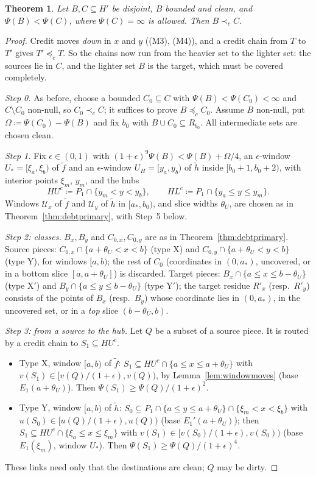 \documentclass[11pt]{article}
\newtheorem{theorem}{Theorem}
\theoremstyle{definition}\newtheorem{definition}[theorem]{Definition}
\theoremstyle{remark}\newtheorem{remark}[theorem]{Remark}
\newcommand{\ftil}{\tilde f}
\newcommand{\htil}{\tilde h}
\begin{document}
\begin{theorem}\label{thm:creditprimary}
Let $B,C\subseteq H'$ be disjoint, $B$ bounded and clean, and
$\Psi(B)<\Psi(C)$, where $\Psi(C)=\infty$ is allowed. Then $B\prec_cC$.
\end{theorem}
\begin{proof}
Credit moves \emph{down} in $x$ and $y$ ((M3), (M4)), and a credit chain from
$T$ to $T'$ gives $T'\preceq_cT$. So the chains now run from the heavier set
to the lighter set: the sources lie in $C$, and the lighter set $B$ is the
target, which must be covered completely.

\emph{Step 0.} As before, choose a bounded $C_0\subseteq C$ with
$\Psi(B)<\Psi(C_0)<\infty$ and $C\setminus C_0$ non-null, so $C_0\prec_cC$;
it suffices to prove $B\preceq_cC_0$. Assume $B$ non-null, put
$\Omega\coloneqq\Psi(C_0)-\Psi(B)$ and fix $b_0$ with $B\cup C_0\subseteq
R_{b_0}$. All intermediate sets are chosen clean.

\emph{Step 1.} Fix $\epsilon\in(0,1)$ with
$(1+\epsilon)^9\Psi(B)<\Psi(B)+\Omega/4$, an $\epsilon$-window
$U_*=[\xi_a,\xi_b)$ of $\ftil$ and an $\epsilon$-window $U_H=[y_a,y_b)$ of
$\htil$ inside $[b_0+1,b_0+2)$, with interior points $\xi_m$, $y_m$, and the
hubs
\[
 HU^c\coloneqq P_1\cap\{y_m<y<y_b\},\qquad HL^c\coloneqq P_1\cap\{y_a\le y\le
 y_m\}.
\]
Windows $\mathcal U_x$ of $\ftil$ and $\mathcal U_y$ of $\htil$ in
$[a_*,b_0)$, and slice widths $\theta_U$, are chosen as in
Theorem~\ref{thm:debtprimary}, with Step~5 below.

\emph{Step 2: classes.} $B_x,B_y$ and $C_{0,x},C_{0,y}$ are as in
Theorem~\ref{thm:debtprimary}. Source pieces: $C_{0,x}\cap\{a+\theta_U<x<b\}$
(type X) and $C_{0,y}\cap\{a+\theta_U<y<b\}$ (type Y), for windows $[a,b)$; the
rest of $C_0$ (coordinates in $(0,a_*)$, uncovered, or in a bottom slice
$[a,a+\theta_U]$) is discarded. Target pieces: $B_x\cap\{a\le x\le
b-\theta_U\}$ (type X$'$) and $B_y\cap\{a\le y\le b-\theta_U\}$ (type Y$'$);
the target residue $R'_x$ (resp.\ $R'_y$) consists of the points of $B_x$
(resp.\ $B_y$) whose coordinate lies in $(0,a_*)$, in the uncovered set,
or in a \emph{top} slice $(b-\theta_U,b)$.

\emph{Step 3: from a source to the hub.} Let $Q$ be a subset of a source
piece. It is routed by a credit chain to $S_1\subseteq HU^c$.
\begin{itemize}[leftmargin=*,itemsep=2pt]
\item Type X, window $[a,b)$ of $\ftil$: $S_1\subseteq HU^c\cap\{a\le x\le
a+\theta_U\}$ with $v(S_1)\in[v(Q)/(1+\epsilon),v(Q))$, by
Lemma~\ref{lem:windowmoves} (base $E_1(a+\theta_U)$). Then
$\Psi(S_1)\ge\Psi(Q)/(1+\epsilon)^2$.
\item Type Y, window $[a,b)$ of $\htil$: $S_0\subseteq P_1\cap\{a\le y\le
a+\theta_U\}\cap\{\xi_m<x<\xi_b\}$ with $u(S_0)\in[u(Q)/(1+\epsilon),u(Q))$
(base $E_1'(a+\theta_U)$); then $S_1\subseteq HU^c\cap\{\xi_a\le x\le\xi_m\}$
with $v(S_1)\in[v(S_0)/(1+\epsilon),v(S_0))$ (base $E_1(\xi_m)$, window
$U_*$). Then $\Psi(S_1)\ge\Psi(Q)/(1+\epsilon)^4$.
\end{itemize}
These links need only that the destinations are clean; $Q$ may be dirty.


\end{proof}
\end{document}
